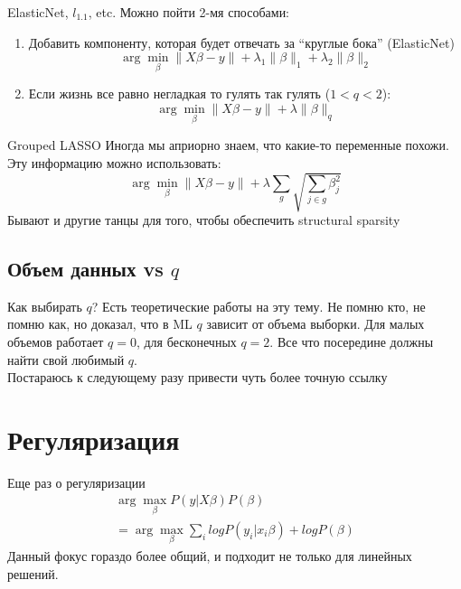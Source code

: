 \documentclass[14pt, fleqn, xcolor={dvipsnames, table}]{beamer}
\begin{document}
\begin{frame}{ElasticNet, $l_1.1$, etc.}
Можно пойти 2-мя способами:
\begin{enumerate}
  \item Добавить компоненту, которая будет отвечать за ``круглые бока'' (ElasticNet)
  $$
    \arg \min_\beta \|X\beta - y \| + \lambda_1 \|\beta\|_1 + \lambda_2 \|\beta\|_2
  $$
  \item Если жизнь все равно негладкая то гулять так гулять ($1 < q < 2$):
  $$
    \arg \min_\beta \|X\beta - y \| + \lambda \|\beta\|_q
  $$
\end{enumerate}
\end{frame}

\begin{frame}{Grouped LASSO}
Иногда мы априорно знаем, что какие-то переменные похожи. Эту информацию можно использовать:
  $$
    \arg \min_\beta \|X\beta - y\| + \lambda \sum_{g} \sqrt{\sum_{j \in g} \beta_j^2}
  $$
Бывают и другие танцы для того, чтобы обеспечить structural sparsity
\end{frame}

\subsection{Объем данных vs $q$}
\begin{frame}{Как выбирать $q$?}
Есть теоретические работы на эту тему. Не помню кто, не помню как, но доказал, что в ML $q$ зависит от объема выборки. Для малых объемов работает $q = 0$, для бесконечных $q=2$. Все что посередине должны найти свой любимый $q$. \\

\footnotesize
Постараюсь к следующему разу привести чуть более точную ссылку
\end{frame}

\section{Регуляризация}
\begin{frame}{Еще раз о регуляризации}
$$\begin{array}{l}
\arg \max_\beta P(y|X\beta) P(\beta) \\
= \arg \max_\beta \sum_i log P(y_i|x_i\beta) + log P(\beta)
\end{array}$$
Данный фокус гораздо более общий, и подходит не только для линейных решений.
\end{frame}
\end{document}
